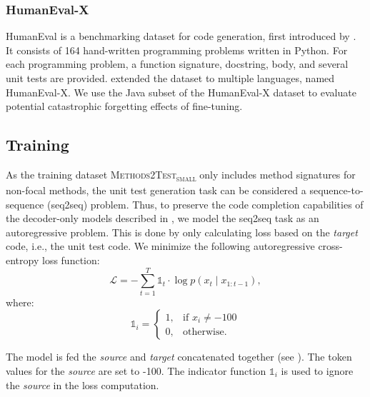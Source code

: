 \documentclass[12pt]{book}
\begin{document}
\subsubsection{HumanEval-X}
HumanEval is a benchmarking dataset for code generation, first introduced by \citet{Chen2021EvaluatingLL}. It consists of 164 hand-written programming problems written in Python. For each programming problem, a function signature, docstring, body, and several unit tests are provided. \citet{Zheng2023CodeGeeXAP} extended the dataset to multiple languages, named HumanEval-X. We use the Java subset of the HumanEval-X dataset to evaluate potential catastrophic forgetting effects of fine-tuning.

\subsection{Training}
As the training dataset \textsc{Methods2Test\textsubscript{small}} only includes method signatures for non-focal methods, the unit test generation task can be considered a sequence-to-sequence (seq2seq) problem. Thus, to preserve the code completion capabilities of the decoder-only models described in , we model the seq2seq task as an autoregressive problem. This is done by only calculating loss based on the \textit{target} code, i.e., the unit test code. We minimize the following autoregressive cross-entropy loss function:
\begin{equation}
\mathcal{L} = - \sum_{t=1}^{T} \mathds{1}_t \cdot \log p(x_t \mid x_{1:t-1}),
\end{equation}
where:
\begin{equation}
\mathds{1}_i = 
\begin{cases}
    1, & \text{if } x_i \neq -100\\
    0, & \text{otherwise}.
\end{cases}
\end{equation}

The model is fed the \textit{source} and \textit{target} concatenated together (see  ). The token values for the \textit{source} are set to -100. The indicator function $\mathds{1}_i$ is used to ignore the \textit{source} in the loss computation.
\end{document}
